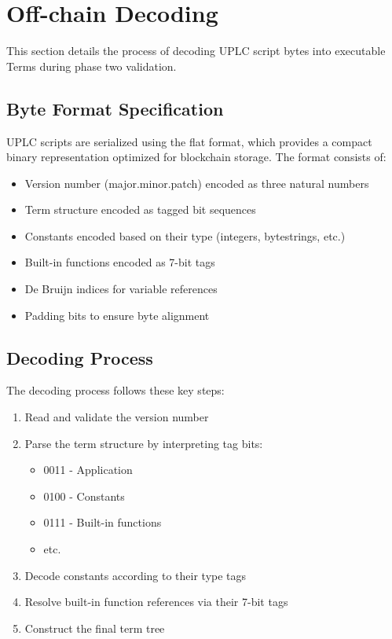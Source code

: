 \documentclass[../midgard.tex]{subfiles}
\begin{document}
\section{Off-chain Decoding}
\label{s:phase-two-decoding-off-chain}

This section details the process of decoding UPLC script bytes into executable Terms during phase two validation.

\subsection{Byte Format Specification}

UPLC scripts are serialized using the flat format, which provides a compact binary representation optimized for blockchain storage. The format consists of:

\begin{itemize}
    \item Version number (major.minor.patch) encoded as three natural numbers
    \item Term structure encoded as tagged bit sequences
    \item Constants encoded based on their type (integers, bytestrings, etc.)
    \item Built-in functions encoded as 7-bit tags
    \item De Bruijn indices for variable references
    \item Padding bits to ensure byte alignment
\end{itemize}

\subsection{Decoding Process}

The decoding process follows these key steps:

\begin{enumerate}
    \item Read and validate the version number
    \item Parse the term structure by interpreting tag bits:
        \begin{itemize}
            \item 0011 - Application
            \item 0100 - Constants
            \item 0111 - Built-in functions
            \item etc.
        \end{itemize}
    \item Decode constants according to their type tags
    \item Resolve built-in function references via their 7-bit tags
    \item Construct the final term tree
\end{enumerate}
\end{document}
